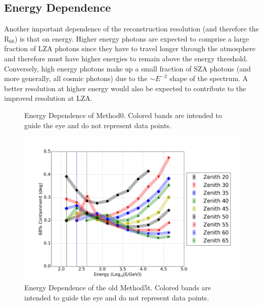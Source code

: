 \documentclass[main.tex]{subfiles}
\begin{document}
\subsection{Energy Dependence}
Another important dependence of the reconstruction resolution (and therefore the R$_{68}$) is that on energy. Higher energy photons are expected to comprise a large fraction of LZA photons since they have to travel longer through the atmosphere and therefore must have higher energies to remain above the energy threshold. Conversely, high energy photons make up a small fraction of SZA photons (and more generally, all cosmic photons) due to the $\sim E^{-2}$ shape of the spectrum. A better resolution at higher energy would also be expected to contribute to the improved resolution at LZA.

\begin{figure}[htbp]
  \centering
  \caption{Energy Dependence of Method0. Colored bands are intended to guide the eye and do not represent data points.}
  \label{fig:energy_reg}
\end{figure}

\begin{figure}[htbp]
  \centering
  \includegraphics[width=.8\linewidth]{images/disp_standard_energy}
  \caption{Energy Dependence of the old Method5t. Colored bands are intended to guide the eye and do not represent data points.}
  \label{fig:energy_disp_standard}    
\end{figure}
\end{document}
